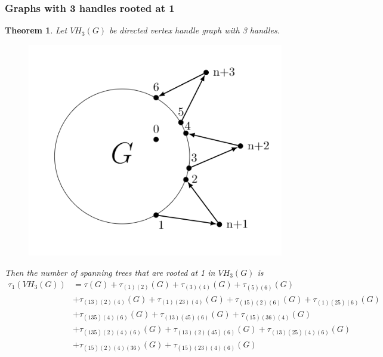 \documentclass[twoside,11pt]{article}
\newtheorem{theorem}{Theorem}[section]
\numberwithin{equation}{section} \DeclareMathOperator{\Var}{Var}
\newcommand{\bthm}{\begin{theorem}}
\newcommand{\ethm}{\end{theorem}}
\begin{document}
\subsubsection{Graphs with 3 handles rooted at 1}
\bthm
Let $VH_3(G)$ be directed vertex handle graph with 3 handles.
\begin{figure}[H]
    \centering
    \includegraphics[scale=0.4]{tik_3handles.PNG}
\end{figure}
Then the number of spanning trees that are rooted at 1 in $VH_3(G)$ is
\begin{equation*}
    \begin{split}
        \tau_1(VH_3(G)) &= \tau(G) + \tau_{(1)(2)}(G)+ \tau_{(3)(4)}(G) + \tau_{(5)(6)}(G)\\ 
        &+ \tau_{(13)(2)(4)}(G) + \tau_{(1)(23)(4)}(G) + \tau_{(15)(2)(6)}(G) + \tau_{(1)(25)(6)}(G)\\
        &+ \tau_{(135)(4)(6)}(G) + \tau_{(13)(45)(6)}(G) + \tau_{(15)(36)(4)}(G)\\
        &+ \tau_{(135)(2)(4)(6)}(G) + \tau_{(13)(2)(45)(6)}(G) + \tau_{(13)(25)(4)(6)}(G)\\
&+ \tau_{(15)(2)(4)(36)}(G) + \tau_{(15)(23)(4)(6)}(G)
    \end{split}
\end{equation*}
\ethm
\end{document}
